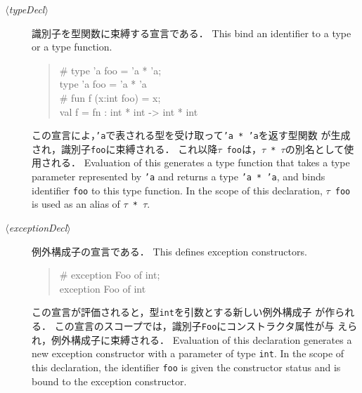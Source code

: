 \documentclass{jbook}
\newcommand{\code}[1]{\mbox{\large\tt #1}}
\newcommand{\nonterm}[1]{\mbox{$\,\langle$}{\it #1}\mbox{$\rangle\,$}}
\newenvironment{program}{\begin{quote}\begin{tt}}%
                        {\end{tt}\end{quote}}
\begin{document}
\begin{description}
\item[\nonterm{typeDecl}] 
\ifjp%
	識別子を型関数に束縛する宣言である．
\else%
	This bind an identifier to a type or a type function.
\fi%
\begin{program}
  \# type 'a foo = 'a * 'a;\\
  type 'a foo = 'a * 'a\\
  \# fun f (x:int foo) = x;\\
  val f = fn : int * int -> int * int
\end{program}
\ifjp%
	この宣言によ，\code{'a}で表される型を受け取って\code{'a * 'a}を返す型関数
が生成され，識別子\code{foo}に束縛される．
	これ以降\code{$\tau$ foo}は，\code{$\tau$ * $\tau$}の別名として使用される．
\else%
	Evaluation of this generates a type function that takes a type
parameter represented by \code{'a} and returns a type \code{'a * 'a},
and binds identifier \code{foo} to this type function.
	In the scope of this declaration, \code{$\tau$ foo} is used as
an alias of \code{$\tau$ * $\tau$}.
\fi%

\item[\nonterm{exceptionDecl}] 
\ifjp%
	例外構成子の宣言である．
\else%
	This defines exception constructors.
\fi%
\begin{program}
  \# exception Foo of int;\\
  exception Foo of int
\end{program}
\ifjp%
	この宣言が評価されると，型\code{int}を引数とする新しい例外構成子
が作られる．
	この宣言のスコープでは，識別子\code{Foo}にコンストラクタ属性が与
えられ，例外構成子に束縛される．
\else%
	Evaluation of this declaration generates a new exception
constructor with a parameter of type \code{int}.
	In the scope of this declaration, the identifier \code{foo} is
given the constructor status and is bound to the exception constructor.
\fi%
\end{description}
\end{document}
